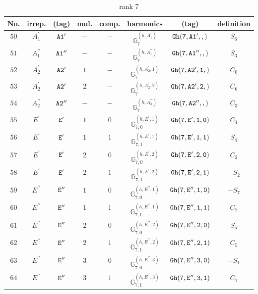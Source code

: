 \documentclass[fleqn,8pt]{jsarticle}
\begin{document}
\begin{table}[ht!]
\begin{center}
\caption{rank 7}
\renewcommand{\arraystretch}{1.3}
\begin{tabular}{cccccccc} \hline \hline
No. & irrep. & (tag) & mul. & comp. & harmonics & (tag) & definition \\ \hline
$ 50 $ & $ A_{1}^{\prime} $ & $ {\tt A1'} $ & $ - $ & $ - $ & $ \mathbb{G}_{7}^{(h,A_{1}^{\prime})} $ & $ {\tt Gh(7,A1',,)} $ & $ S_{6} $ \\
$ 51 $ & $ A_{1}^{\prime\prime} $ & $ {\tt A1''} $ & $ - $ & $ - $ & $ \mathbb{G}_{7}^{(h,A_{1}^{\prime\prime})} $ & $ {\tt Gh(7,A1'',,)} $ & $ S_{3} $ \\
$ 52 $ & $ A_{2}^{\prime} $ & $ {\tt A2'} $ & $ 1 $ & $ - $ & $ \mathbb{G}_{7}^{(h,A_{2}^{\prime},1)} $ & $ {\tt Gh(7,A2',1,)} $ & $ C_{0} $ \\
$ 53 $ & $ A_{2}^{\prime} $ & $ {\tt A2'} $ & $ 2 $ & $ - $ & $ \mathbb{G}_{7}^{(h,A_{2}^{\prime},2)} $ & $ {\tt Gh(7,A2',2,)} $ & $ C_{6} $ \\
$ 54 $ & $ A_{2}^{\prime\prime} $ & $ {\tt A2''} $ & $ - $ & $ - $ & $ \mathbb{G}_{7}^{(h,A_{2}^{\prime\prime})} $ & $ {\tt Gh(7,A2'',,)} $ & $ C_{3} $ \\
$ 55 $ & $ E^{\prime} $ & $ {\tt E'} $ & $ 1 $ & $ 0 $ & $ \mathbb{G}_{7,0}^{(h,E^{\prime},1)} $ & $ {\tt Gh(7,E',1,0)} $ & $ C_{4} $ \\
$ 56 $ & $ E^{\prime} $ & $ {\tt E'} $ & $ 1 $ & $ 1 $ & $ \mathbb{G}_{7,1}^{(h,E^{\prime},1)} $ & $ {\tt Gh(7,E',1,1)} $ & $ S_{4} $ \\
$ 57 $ & $ E^{\prime} $ & $ {\tt E'} $ & $ 2 $ & $ 0 $ & $ \mathbb{G}_{7,0}^{(h,E^{\prime},2)} $ & $ {\tt Gh(7,E',2,0)} $ & $ C_{2} $ \\
$ 58 $ & $ E^{\prime} $ & $ {\tt E'} $ & $ 2 $ & $ 1 $ & $ \mathbb{G}_{7,1}^{(h,E^{\prime},2)} $ & $ {\tt Gh(7,E',2,1)} $ & $ - S_{2} $ \\
$ 59 $ & $ E^{\prime\prime} $ & $ {\tt E''} $ & $ 1 $ & $ 0 $ & $ \mathbb{G}_{7,0}^{(h,E^{\prime\prime},1)} $ & $ {\tt Gh(7,E'',1,0)} $ & $ - S_{7} $ \\
$ 60 $ & $ E^{\prime\prime} $ & $ {\tt E''} $ & $ 1 $ & $ 1 $ & $ \mathbb{G}_{7,1}^{(h,E^{\prime\prime},1)} $ & $ {\tt Gh(7,E'',1,1)} $ & $ C_{7} $ \\
$ 61 $ & $ E^{\prime\prime} $ & $ {\tt E''} $ & $ 2 $ & $ 0 $ & $ \mathbb{G}_{7,0}^{(h,E^{\prime\prime},2)} $ & $ {\tt Gh(7,E'',2,0)} $ & $ S_{5} $ \\
$ 62 $ & $ E^{\prime\prime} $ & $ {\tt E''} $ & $ 2 $ & $ 1 $ & $ \mathbb{G}_{7,1}^{(h,E^{\prime\prime},2)} $ & $ {\tt Gh(7,E'',2,1)} $ & $ C_{5} $ \\
$ 63 $ & $ E^{\prime\prime} $ & $ {\tt E''} $ & $ 3 $ & $ 0 $ & $ \mathbb{G}_{7,0}^{(h,E^{\prime\prime},3)} $ & $ {\tt Gh(7,E'',3,0)} $ & $ - S_{1} $ \\
$ 64 $ & $ E^{\prime\prime} $ & $ {\tt E''} $ & $ 3 $ & $ 1 $ & $ \mathbb{G}_{7,1}^{(h,E^{\prime\prime},3)} $ & $ {\tt Gh(7,E'',3,1)} $ & $ C_{1} $ \\
 \hline \hline
\end{tabular}
\end{center}
\end{table}
\end{document}
